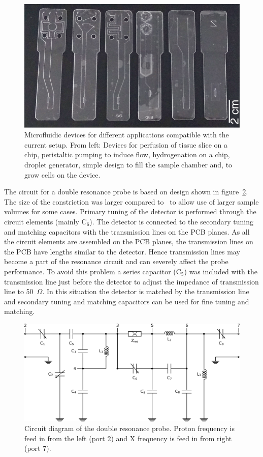 \documentclass[preprint,12pt]{article}
\begin{document}
\begin{figure}
\centering
\includegraphics[width=.7\linewidth,keepaspectratio=true]{./figures/ms5n17-tlp-im-181007-devices.png} 
\caption{Microfluidic devices for different applications compatible with the current setup. From left: Devices for perfusion of tissue slice on a chip, peristaltic pumping to induce flow, hydrogenation on a chip, droplet generator, simple design to fill the sample chamber and, to grow cells on the device.}
\label{fig:device} 
\end{figure}
The circuit for a double resonance probe is based on design shown in figure~\ref{fig:circuit}. The size of the constriction was larger compared to~\cite{gream_2016} to allow use of larger sample volumes for some cases. Primary tuning of the detector is performed through the circuit elements (mainly C$_6$). The detector is connected to the secondary tuning and matching capacitors with the transmission lines on the PCB planes. As all the circuit elements are assembled on the PCB planes, the transmission lines on the PCB have lengths similar to the detector. Hence transmission lines may become a part of the resonance circuit and can severely affect the probe performance. To avoid this problem a series capacitor (C$_5$) was included with the transmission line just before the detector to adjust the impedance of transmission line to 50~$\Omega$. In this situation the detector is matched by the transmission line and secondary tuning and matching capacitors can be used for fine tuning and matching.\par
\begin{figure}
\centering
\includegraphics[width=.7\linewidth,keepaspectratio=true]{./figures/ms5n17-tlp-im-180110-circuit-diagram.png}
\caption{Circuit diagram of the double resonance probe. Proton frequency is feed in from the left (port 2) and X frequency is feed in from right (port 7).}
\label{fig:circuit}
\end{figure}
\end{document}
